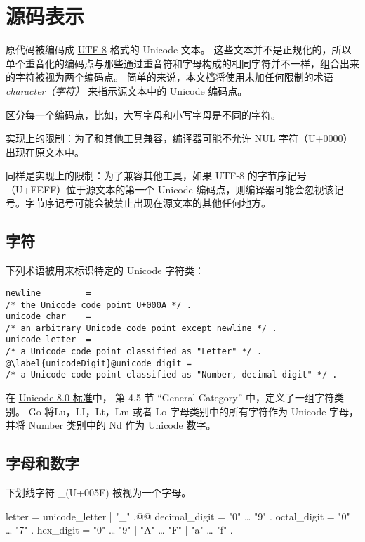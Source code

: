 
\chapter{源码表示}
原代码被编码成 \href{http://en.wikipedia.org/wiki/UTF-8}{UTF-8} 格式的 Unicode 文本。
这些文本并不是正规化的，所以单个重音化的编码点与那些通过重音符和字母构成的相同字符并不一样，组合出来的字符被视为两个编码点。
简单的来说，本文档将使用未加任何限制的术语 \emph{character（字符）} 来指示源文本中的 Unicode 编码点。

区分每一个编码点，比如，大写字母和小写字母是不同的字符。

实现上的限制：为了和其他工具兼容，编译器可能不允许 NUL 字符（U+0000）出现在原文本中。

同样是实现上的限制：为了兼容其他工具，如果 UTF-8 的字节序记号（U+FEFF）位于源文本的第一个 Unicode 编码点，则编译器可能会忽视该记号。字节序记号可能会被禁止出现在源文本的其他任何地方。

\section{字符}
下列术语被用来标识特定的 Unicode 字符类：
\begin{lstlisting}[style=EBNF]
newline			= 
/* the Unicode code point U+000A */ .
unicode_char	=
/* an arbitrary Unicode code point except newline */ .
unicode_letter	= 
/* a Unicode code point classified as "Letter" */ .
@\label{unicodeDigit}@unicode_digit	= 
/* a Unicode code point classified as "Number, decimal digit" */ .
\end{lstlisting}
在 \href{http://www.unicode.org/versions/Unicode8.0.0/}{Unicode 8.0 标准}中，
第 4.5 节 ``General Category'' 中，定义了一组字符类别。
Go 将Lu，LI，Lt，Lm 或者 Lo 字母类别中的所有字符作为 Unicode 字母，
并将 Number 类别中的 Nd 作为 Unicode 数字。

\section{字母和数字}
下划线字符 \_(U+005F) 被视为一个字母。
\begin{EBNF}
letter        = unicode_letter | "_" .@\label{letter}@
decimal_digit = "0" … "9" .
octal_digit   = "0" … "7" .
hex_digit     = "0" … "9" | "A" … "F" | "a" … "f" .
\end{EBNF}




